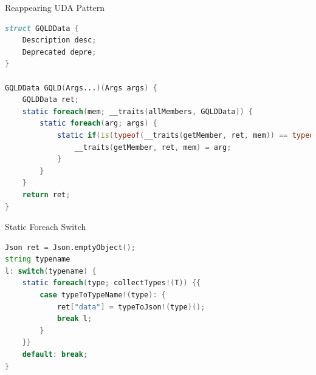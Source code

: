 \documentclass[aspectratio=169,notes]{beamer}
\begin{document}
	\begin{frame}[fragile]{Reappearing UDA Pattern}
\begin{lstlisting}[language=D,basicstyle=\scriptsize\ttfamily]
struct GQLDData {
	Description desc;
	Deprecated depre;
}

GQLDData GQLD(Args...)(Args args) {
	GQLDData ret;
	static foreach(mem; __traits(allMembers, GQLDData)) {
		static foreach(arg; args) {
			static if(is(typeof(__traits(getMember, ret, mem)) == typeof(arg))) {
				__traits(getMember, ret, mem) = arg;
			}
		}
	}
	return ret;
}
\end{lstlisting}
	\end{frame}

	\begin{frame}[fragile]{Static Foreach Switch}
\begin{lstlisting}[language=D,basicstyle=\scriptsize\ttfamily]
Json ret = Json.emptyObject();
string typename
l: switch(typename) {
	static foreach(type; collectTypes!(T)) {{
		case typeToTypeName!(type): {
			ret["data"] = typeToJson!(type)();
			break l;
		}
	}}
	default: break;
}
\end{lstlisting}
	\end{frame}

	\printbibliography
\end{document}
